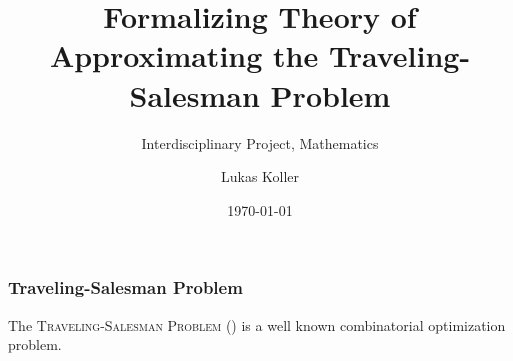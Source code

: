 \documentclass{beamer} %
\title{Formalizing Theory of Approximating the Traveling-Salesman Problem}
\subtitle{Interdisciplinary Project, Mathematics}
\author{Lukas Koller}
\date{\today}
\begin{document}
\frame{\titlepage}




\begin{frame}
  \frametitle{Traveling-Salesman Problem}

  The \textsc{Traveling-Salesman Problem} (\TSP{}) is a well known combinatorial optimization problem.


\end{frame}
\end{document}

